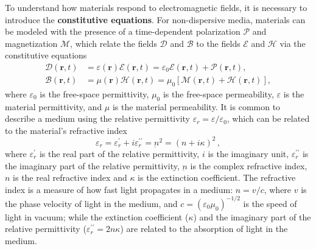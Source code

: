 To understand how materials respond to electromagnetic fields, it is necessary to introduce the \textbf{constitutive equations}.
 For non-dispersive media, materials can be
modeled
with the presence of a time-dependent polarization $\bm{\mathcal{P}}$ and
magnetization $\bm{\mathcal{M}}$,
which relate the fields $\bm{\mathcal{D}}$ and $\bm{\mathcal{B}}$ to the fields
$\bm{\mathcal{E}}$ and
$\bm{\mathcal{H}}$ via the constitutive equations~\cite{novotny}
\begin{align}
    \bm{\mathcal{D}}(\mathbf{r}, t) & = \varepsilon(\mathbf{r}) \bm{\mathcal{E}}(\mathbf{r}, t) =
    \varepsilon_0 \bm{\mathcal{E}}(\mathbf{r}, t) + \bm{\mathcal{P}}(\mathbf{r}, t),
    \label{eq:D}                                                                \\
    \bm{\mathcal{B}}(\mathbf{r}, t) & =  \mu(\mathbf{r}) \bm{\mathcal{H}}(\mathbf{r},
    t) = \mu_0 \left[ \bm{\mathcal{M}}(\mathbf{r},
    t) + \bm{\mathcal{H}}(\mathbf{r}, t)\right] \label{eq:H},
\end{align}
where $\varepsilon_0$ is the free-space permittivity, $\mu_0$ is the free-space
permeability, $\varepsilon$ is the material permittivity, and 
$\mu$ is the material permeability. It is common to describe a medium
using the relative permittivity $\varepsilon_r=\varepsilon/\varepsilon_0$, which can be related to the material's refractive index~\cite{wooten}
\begin{equation}\label{eq:perm}
    \varepsilon_r = \varepsilon_r^\prime +
i \varepsilon_r^{\prime\prime} = \underbar{n}^2 = (n+ i\kappa)^2\,,
\end{equation}
where $\varepsilon_r^\prime$ is the real part of the relative permittivity, $i$ is the imaginary unit, $\varepsilon_r^{\prime\prime}$ is the imaginary part of the relative permittivity, $\underbar{n}$ is the complex refractive index, 
$n$ is the real refractive index and $\kappa$ is the extinction coefficient. 
The refractive index is a measure of how fast light propagates in a medium: $n=v/c$, where $v$ is the phase velocity of light in the medium, and 
$c=(\varepsilon_0 \mu_0)^{-1/2}$ is the speed of light in vacuum; while the extinction
coefficient ($\kappa$) and the imaginary part of the relative permittivity ($\varepsilon_r^{\prime\prime}=2n\kappa$) are related to the absorption of light in the medium.


